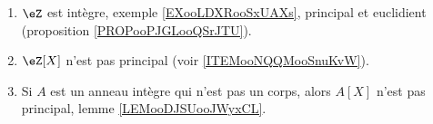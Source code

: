 
\begin{enumerate}
    \item
        \( \eZ\) est intègre, exemple \ref{EXooLDXRooSxUAXs}, principal et euclidient (proposition \ref{PROPooPJGLooQSrJTU}).
    \item
        \( \eZ[X]\) n'est pas principal (voir \ref{ITEMooNQQMooSnuKvW}).
    \item   \label{ITEMooNQQMooSnuKvW}
        Si \( A\) est un anneau intègre qui n'est pas un corps, alors \( A[X]\) n'est pas principal, lemme \ref{LEMooDJSUooJWyxCL}.
\end{enumerate}

